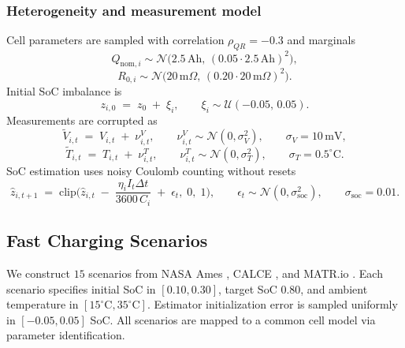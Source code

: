 \documentclass[%
 aip,
 amsmath,amssymb,
reprint, onecolumn %
]{revtex4-1}
\begin{document}
\subsubsection{Heterogeneity and measurement model}
\label{subsubsec:heterogeneity_measurements}
Cell parameters are sampled with correlation $\rho_{QR}=-0.3$ and marginals
\begin{equation}
Q_{\mathrm{nom},i} \sim \mathcal{N}\big(2.5\,\mathrm{Ah},\, (0.05 \cdot 2.5\,\mathrm{Ah})^2\big),
\end{equation}
\begin{equation}
R_{0,i} \sim \mathcal{N}\big(20\,\mathrm{m}\Omega,\, (0.20 \cdot 20\,\mathrm{m}\Omega)^2\big).
\end{equation}
Initial SoC imbalance is
\begin{equation}
z_{i,0} \;=\; z_0 \;+\; \xi_i,
\qquad \xi_i \sim \mathcal{U}(-0.05,\, 0.05).
\end{equation}
Measurements are corrupted as
\begin{equation}
\tilde V_{i,t} \;=\; V_{i,t} \;+\; \nu^{V}_{i,t},
\qquad \nu^{V}_{i,t} \sim \mathcal{N}(0, \sigma_V^2),
\qquad \sigma_V = 10\,\mathrm{mV},
\end{equation}
\begin{equation}
\tilde T_{i,t} \;=\; T_{i,t} \;+\; \nu^{T}_{i,t},
\qquad \nu^{T}_{i,t} \sim \mathcal{N}(0, \sigma_T^2),
\qquad \sigma_T = 0.5^\circ\mathrm{C}.
\end{equation}
SoC estimation uses noisy Coulomb counting without resets
\begin{equation}
\hat z_{i,t+1} \;=\; \mathrm{clip}\!\Big( \hat z_{i,t} \;-\; \frac{\eta_i I_t \Delta t}{3600\, C_i} \;+\; \epsilon_t,\; 0,\; 1 \Big),
\qquad \epsilon_t \sim \mathcal{N}(0, \sigma_{\mathrm{soc}}^2),
\qquad \sigma_{\mathrm{soc}} = 0.01.
\end{equation}

\subsection{Fast Charging Scenarios}
\label{subsec:scenarios}
We construct $15$ scenarios from NASA Ames \cite{saha2008battery}, CALCE \cite{xing2014battery}, and MATR.io \cite{severson2019data}. Each scenario specifies initial SoC in $[0.10,0.30]$, target SoC $0.80$, and ambient temperature in $[15^\circ\mathrm{C},35^\circ\mathrm{C}]$. Estimator initialization error is sampled uniformly in $[-0.05,0.05]$ SoC. All scenarios are mapped to a common cell model via parameter identification.
\end{document}
